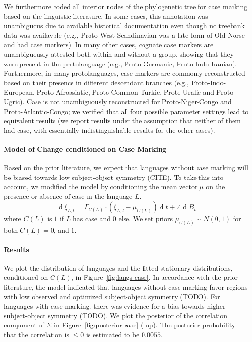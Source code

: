 \documentclass[11pt,a4paper]{article}
\begin{document}
We furthermore coded all interior nodes of the phylogenetic tree for case marking based on the linguistic literature.
In some cases, this annotation was unambiguous due to available historical documentation even though no treebank data was availavble (e.g., Proto-West-Scandinavian was a late form of Old Norse and had case markers).
In many other cases, cognate case markers are unambiguously attested both within and without a group, showing that they were present in the protolanguage (e.g., Proto-Germanic, Proto-Indo-Iranian).
Furthermore, in many protolanguages, case markers are commonly reconstructed based on their presence in different descendant branches (e.g., Proto-Indo-European, Proto-Afroasiatic, Proto-Common-Turkic, Proto-Uralic and Proto-Ugric). %
Case is not unambiguously reconstructed for Proto-Niger-Congo and Proto-Atlantic-Congo; we verified that all four possible parameter settings lead to equivalent results (we report results under the assumption that neither of them had case, with essentially indistinguishable results for the other cases).

\paragraph{Model of Change conditioned on Case Marking}
Based on the prior literature, we expect that languages without case marking will be biased towards low subject-object symmetry (CITE).
To take this into account, we modified the model by conditioning the mean vector $\mu$ on the presence or absence of case in the language $L$.
\begin{equation*}
    \operatorname{d}\xi_{L,t} = \Gamma_{C(L)} \cdot (\xi_{L,t}-\mu_{C(L)}) \operatorname{d}t + \Lambda \operatorname{d}B_t
\end{equation*}
where $C(L)$ is $1$ if $L$ has case and $0$ else.
We set priors $\mu_{C(L)} \sim N(0,1)$ for both $C(L) = 0$, and $1$.


\paragraph{Results}
We plot the distribution of languages and the fitted stationary distributions, conditioned on $C(L)$, in Figure~\ref{fig:langs-case}.
In accordance with the prior literature, the model indicated that languages without case marking favor regions with low observed and optimized subject-object symmetry (TODO).
For languages with case marking, there was evidence for a bias towards higher subject-object symmetry (TODO).
We plot the posterior of the correlation component of $\Sigma$ in Figure~\ref{fig:posterior-case} (top).
The posterior probability that the correlation is $\leq 0$ is estimated to be $0.0055$.
\end{document}

